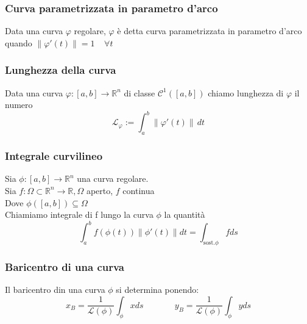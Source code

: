 \documentclass{article} %
\begin{document}
    \subsubsection*{Curva parametrizzata in parametro d'arco}
    Data una curva $\varphi$ regolare, $\varphi$ è detta curva parametrizzata in parametro d'arco
    quando $ \| \varphi  '(t) \| = 1 \ \ \ \ \ \forall t $

    \subsubsection*{Lunghezza della curva}
    Data una curva $\varphi:[a,b]\to \mathbb{R} ^n $ di classe $ \mathcal{C} ^1([a,b]) $ chiamo 
    lunghezza di $\varphi$ il numero 
    $$ \mathcal{L} _\varphi := \int_{a}^{b} \| \varphi  '(t) \| \, dt  $$

    \subsubsection*{Integrale curvilineo}
    Sia $\phi:[a,b]\to \mathbb{R}^n$ una curva regolare. \\
    Sia $f: \Omega \subset \mathbb{R}^n \to \mathbb{R}, \Omega$ aperto, $f$ continua \\
    Dove $\phi([a,b]) \subseteq \Omega$ \\
    Chiamiamo integrale di f lungo la curva $\phi$ la quantità \\
    $$\int_{a}^{b} f(\phi(t)) \lVert \phi'(t) \rVert dt = \int_{\text{sost.}\phi} f ds $$ 

    \subsubsection*{Baricentro di una curva}
    Il baricentro din una curva $\phi$ si determina ponendo:
    $$x_B= \frac{1}{\mathcal{L}(\phi)} \int_{\phi} x ds \,\,\,\,\,\,\,\,\,\,\,\,\,\,\,\,\,\,\,\,\,\, y_B= \frac{1}{\mathcal{L}(\phi)} \int_{\phi} y ds$$
\end{document}
